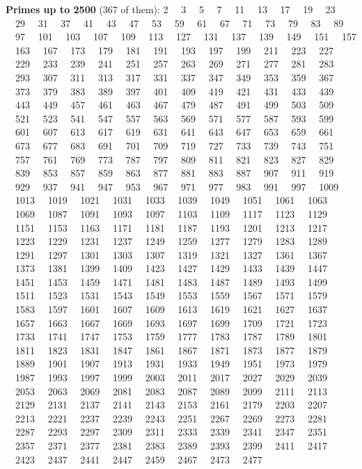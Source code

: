 \documentclass{fkt-notes}
\theoremstyle{definition}
\begin{document}
{\raggedright\fontsize{8.6}{10.4}\selectfont
  \textbf{Primes up to 2500} (367 of them): 2 \ \ 3 \ \ 5 \ \ 7 \ \ 11 \ \ 13 \ \ 17 \ \ 19 \ \ 23 \ \ 29 \ \ 31 \ \ 37 \ \ 41 \ \ 43 \ \ 47 \ \ 53 \ \ 59 \ \ 61 \ \ 67 \ \ 71 \ \ 73 \ \ 79 \ \ 83 \ \ 89 \ \ 97 \ \ 101 \ \ 103 \ \ 107 \ \ 109 \ \ 113 \ \ 127 \ \ 131 \ \ 137 \ \ 139 \ \ 149 \ \ 151 \ \ 157 \ \ 163 \ \ 167 \ \ 173 \ \ 179 \ \ 181 \ \ 191 \ \ 193 \ \ 197 \ \ 199 \ \ 211 \ \ 223 \ \ 227 \ \ 229 \ \ 233 \ \ 239 \ \ 241 \ \ 251 \ \ 257 \ \ 263 \ \ 269 \ \ 271 \ \ 277 \ \ 281 \ \ 283 \ \ 293 \ \ 307 \ \ 311 \ \ 313 \ \ 317 \ \ 331 \ \ 337 \ \ 347 \ \ 349 \ \ 353 \ \ 359 \ \ 367 \ \ 373 \ \ 379 \ \ 383 \ \ 389 \ \ 397 \ \ 401 \ \ 409 \ \ 419 \ \ 421 \ \ 431 \ \ 433 \ \ 439 \ \ 443 \ \ 449 \ \ 457 \ \ 461 \ \ 463 \ \ 467 \ \ 479 \ \ 487 \ \ 491 \ \ 499 \ \ 503 \ \ 509 \ \ 521 \ \ 523 \ \ 541 \ \ 547 \ \ 557 \ \ 563 \ \ 569 \ \ 571 \ \ 577 \ \ 587 \ \ 593 \ \ 599 \ \ 601 \ \ 607 \ \ 613 \ \ 617 \ \ 619 \ \ 631 \ \ 641 \ \ 643 \ \ 647 \ \ 653 \ \ 659 \ \ 661 \ \ 673 \ \ 677 \ \ 683 \ \ 691 \ \ 701 \ \ 709 \ \ 719 \ \ 727 \ \ 733 \ \ 739 \ \ 743 \ \ 751 \ \ 757 \ \ 761 \ \ 769 \ \ 773 \ \ 787 \ \ 797 \ \ 809 \ \ 811 \ \ 821 \ \ 823 \ \ 827 \ \ 829 \ \ 839 \ \ 853 \ \ 857 \ \ 859 \ \ 863 \ \ 877 \ \ 881 \ \ 883 \ \ 887 \ \ 907 \ \ 911 \ \ 919 \ \ 929 \ \ 937 \ \ 941 \ \ 947 \ \ 953 \ \ 967 \ \ 971 \ \ 977 \ \ 983 \ \ 991 \ \ 997 \ \ 1009 \ \ 1013 \ \ 1019 \ \ 1021 \ \ 1031 \ \ 1033 \ \ 1039 \ \ 1049 \ \ 1051 \ \ 1061 \ \ 1063 \ \ 1069 \ \ 1087 \ \ 1091 \ \ 1093 \ \ 1097 \ \ 1103 \ \ 1109 \ \ 1117 \ \ 1123 \ \ 1129 \ \ 1151 \ \ 1153 \ \ 1163 \ \ 1171 \ \ 1181 \ \ 1187 \ \ 1193 \ \ 1201 \ \ 1213 \ \ 1217 \ \ 1223 \ \ 1229 \ \ 1231 \ \ 1237 \ \ 1249 \ \ 1259 \ \ 1277 \ \ 1279 \ \ 1283 \ \ 1289 \ \ 1291 \ \ 1297 \ \ 1301 \ \ 1303 \ \ 1307 \ \ 1319 \ \ 1321 \ \ 1327 \ \ 1361 \ \ 1367 \ \ 1373 \ \ 1381 \ \ 1399 \ \ 1409 \ \ 1423 \ \ 1427 \ \ 1429 \ \ 1433 \ \ 1439 \ \ 1447 \ \ 1451 \ \ 1453 \ \ 1459 \ \ 1471 \ \ 1481 \ \ 1483 \ \ 1487 \ \ 1489 \ \ 1493 \ \ 1499 \ \ 1511 \ \ 1523 \ \ 1531 \ \ 1543 \ \ 1549 \ \ 1553 \ \ 1559 \ \ 1567 \ \ 1571 \ \ 1579 \ \ 1583 \ \ 1597 \ \ 1601 \ \ 1607 \ \ 1609 \ \ 1613 \ \ 1619 \ \ 1621 \ \ 1627 \ \ 1637 \ \ 1657 \ \ 1663 \ \ 1667 \ \ 1669 \ \ 1693 \ \ 1697 \ \ 1699 \ \ 1709 \ \ 1721 \ \ 1723 \ \ 1733 \ \ 1741 \ \ 1747 \ \ 1753 \ \ 1759 \ \ 1777 \ \ 1783 \ \ 1787 \ \ 1789 \ \ 1801 \ \ 1811 \ \ 1823 \ \ 1831 \ \ 1847 \ \ 1861 \ \ 1867 \ \ 1871 \ \ 1873 \ \ 1877 \ \ 1879 \ \ 1889 \ \ 1901 \ \ 1907 \ \ 1913 \ \ 1931 \ \ 1933 \ \ 1949 \ \ 1951 \ \ 1973 \ \ 1979 \ \ 1987 \ \ 1993 \ \ 1997 \ \ 1999 \ \ 2003 \ \ 2011 \ \ 2017 \ \ 2027 \ \ 2029 \ \ 2039 \ \ 2053 \ \ 2063 \ \ 2069 \ \ 2081 \ \ 2083 \ \ 2087 \ \ 2089 \ \ 2099 \ \ 2111 \ \ 2113 \ \ 2129 \ \ 2131 \ \ 2137 \ \ 2141 \ \ 2143 \ \ 2153 \ \ 2161 \ \ 2179 \ \ 2203 \ \ 2207 \ \ 2213 \ \ 2221 \ \ 2237 \ \ 2239 \ \ 2243 \ \ 2251 \ \ 2267 \ \ 2269 \ \ 2273 \ \ 2281 \ \ 2287 \ \ 2293 \ \ 2297 \ \ 2309 \ \ 2311 \ \ 2333 \ \ 2339 \ \ 2341 \ \ 2347 \ \ 2351 \ \ 2357 \ \ 2371 \ \ 2377 \ \ 2381 \ \ 2383 \ \ 2389 \ \ 2393 \ \ 2399 \ \ 2411 \ \ 2417 \ \ 2423 \ \ 2437 \ \ 2441 \ \ 2447 \ \ 2459 \ \ 2467 \ \ 2473 \ \ 2477\par}
\endgroup
\clearpage
{}

\clearpage
{}
{}
\printindex
\end{document}
